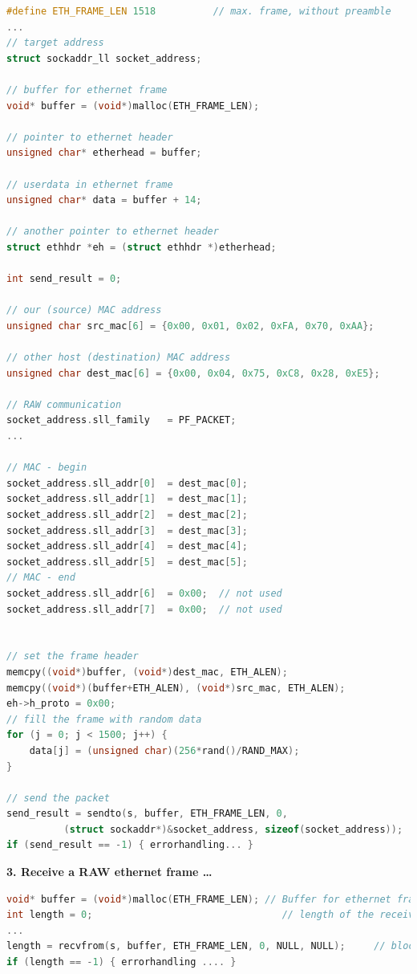 \begin{lstlisting}[style=mystyle, language=c]
#define ETH_FRAME_LEN 1518			// max. frame, without preamble
...
// target address
struct sockaddr_ll socket_address;

// buffer for ethernet frame
void* buffer = (void*)malloc(ETH_FRAME_LEN);
 
// pointer to ethernet header
unsigned char* etherhead = buffer;
	
// userdata in ethernet frame
unsigned char* data = buffer + 14;
	
// another pointer to ethernet header
struct ethhdr *eh = (struct ethhdr *)etherhead;
 
int send_result = 0;

// our (source) MAC address
unsigned char src_mac[6] = {0x00, 0x01, 0x02, 0xFA, 0x70, 0xAA};

// other host (destination) MAC address
unsigned char dest_mac[6] = {0x00, 0x04, 0x75, 0xC8, 0x28, 0xE5};

// RAW communication
socket_address.sll_family   = PF_PACKET;	
...

// MAC - begin
socket_address.sll_addr[0]  = dest_mac[0];		
socket_address.sll_addr[1]  = dest_mac[1];		
socket_address.sll_addr[2]  = dest_mac[2];
socket_address.sll_addr[3]  = dest_mac[3];
socket_address.sll_addr[4]  = dest_mac[4];
socket_address.sll_addr[5]  = dest_mac[5];
// MAC - end
socket_address.sll_addr[6]  = 0x00;  // not used
socket_address.sll_addr[7]  = 0x00;  // not used


// set the frame header
memcpy((void*)buffer, (void*)dest_mac, ETH_ALEN);
memcpy((void*)(buffer+ETH_ALEN), (void*)src_mac, ETH_ALEN);
eh->h_proto = 0x00;
// fill the frame with random data
for (j = 0; j < 1500; j++) {
	data[j] = (unsigned char)(256*rand()/RAND_MAX);
}

// send the packet
send_result = sendto(s, buffer, ETH_FRAME_LEN, 0, 
	      (struct sockaddr*)&socket_address, sizeof(socket_address));
if (send_result == -1) { errorhandling... }
\end{lstlisting}

\textbf{3. Receive a RAW ethernet frame {\dots}}

\begin{lstlisting}[style=mystyle, language=c]
void* buffer = (void*)malloc(ETH_FRAME_LEN); // Buffer for ethernet frame
int length = 0;                           		// length of the received frame
...
length = recvfrom(s, buffer, ETH_FRAME_LEN, 0, NULL, NULL);		// blocking ...
if (length == -1) { errorhandling .... }
\end{lstlisting}